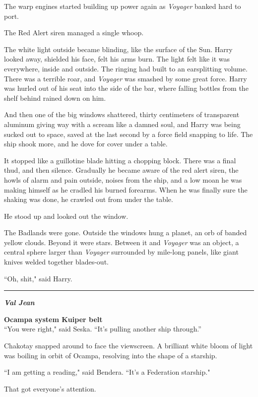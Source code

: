\documentclass[twoside,letterpaper,12pt]{memoir}
\begin{document}
The warp engines started building up power again as \textit{Voyager} banked hard to port.

The Red Alert siren managed a single whoop.

The white light outside became blinding, like the surface of the Sun. Harry looked away, shielded his face, felt his arms burn. The light felt like it was everywhere, inside and outside. The ringing had built to an earsplitting volume. There was a terrible roar, and \textit{Voyager} was smashed by some great force. Harry was hurled out of his seat into the side of the bar, where falling bottles from the shelf behind rained down on him.

And then one of the big windows shattered, thirty centimeters of transparent aluminum giving way with a scream like a damned soul, and Harry was being sucked out to space, saved at the last second by a force field snapping to life. The ship shook more, and he dove for cover under a table.

It stopped like a guillotine blade hitting a chopping block. There was a final thud, and then silence. Gradually he became aware of the red alert siren, the howls of alarm and pain outside, noises from the ship, and a low moan he was making himself as he cradled his burned forearms. When he was finally sure the shaking was done, he crawled out from under the table.

He stood up and looked out the window.

The Badlands were gone. Outside the windows hung a planet, an orb of banded yellow clouds. Beyond it were stars. Between it and \textit{Voyager} was an object, a central sphere larger than \textit{Voyager} surrounded by mile-long panels, like giant knives welded together blades-out.

``Oh, shit," said Harry.

\fancybreak{\rule{3cm}{0.4 pt}}
\noindent\textit{\textbf{Val Jean}}

\noindent\textbf{Ocampa system Kuiper belt}\\

``You were right," said Seska. ``It’s pulling another ship through.''

Chakotay snapped around to face the viewscreen. A brilliant white bloom of light was boiling in orbit of Ocampa, resolving into the shape of a starship.

``I am getting a reading," said Bendera. ``It's a Federation starship."

That got everyone's attention.
\end{document}
